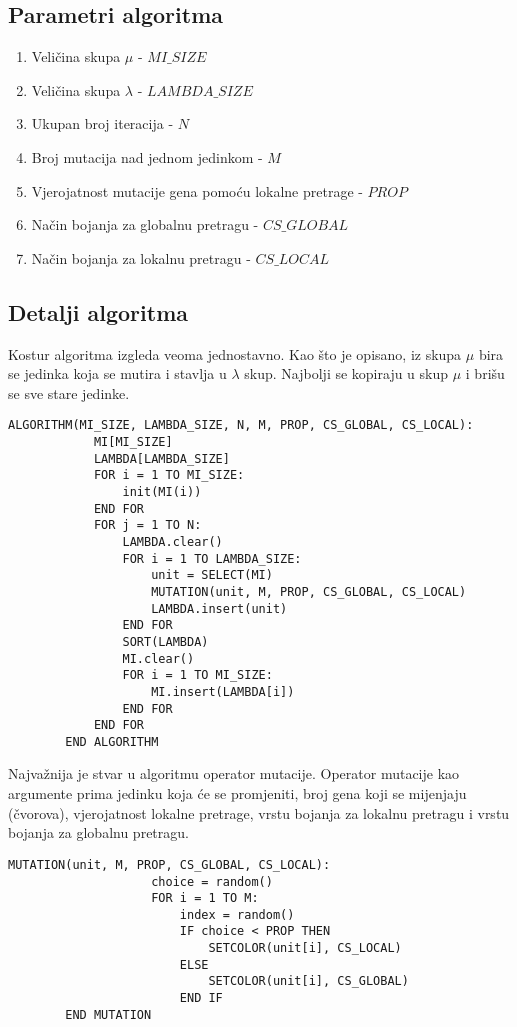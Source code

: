 \documentclass[times, utf8, diplomski, numeric]{fer}
\begin{document}
\subsection{Parametri algoritma}

\begin{enumerate}
	\item Veličina skupa $\mu$ - $MI\_SIZE$
	\item Veličina skupa $\lambda$ - $LAMBDA\_SIZE$
	\item Ukupan broj iteracija - $N$
	\item Broj mutacija nad jednom jedinkom - $M$
	\item Vjerojatnost mutacije gena pomoću lokalne pretrage - $PROP$
	\item Način bojanja za globalnu pretragu - $CS\_GLOBAL$
	\item Način bojanja za lokalnu pretragu - $CS\_LOCAL$
\end{enumerate}

\subsection{Detalji algoritma}

Kostur algoritma izgleda veoma jednostavno. Kao što je opisano, iz skupa $\mu$ bira se jedinka koja se mutira i stavlja u $\lambda$ skup. Najbolji se kopiraju u skup $\mu$ i brišu se sve stare jedinke. 

\begin{singlespace}
	\begin{lstlisting}[caption=Pseudok\^{o}d evolucijske strategije]
		ALGORITHM(MI_SIZE, LAMBDA_SIZE, N, M, PROP, CS_GLOBAL, CS_LOCAL):
			MI[MI_SIZE]
			LAMBDA[LAMBDA_SIZE]
			FOR i = 1 TO MI_SIZE:
				init(MI(i))
			END FOR
			FOR j = 1 TO N:
				LAMBDA.clear()
				FOR i = 1 TO LAMBDA_SIZE:
					unit = SELECT(MI)
					MUTATION(unit, M, PROP, CS_GLOBAL, CS_LOCAL)
					LAMBDA.insert(unit)
				END FOR
				SORT(LAMBDA)
				MI.clear()
				FOR i = 1 TO MI_SIZE:
					MI.insert(LAMBDA[i])
				END FOR
			END FOR
		END ALGORITHM
	\end{lstlisting}
\end{singlespace}

Najvažnija je stvar u algoritmu operator mutacije. Operator mutacije kao argumente prima jedinku koja će se promjeniti, broj gena koji se mijenjaju (čvorova), vjerojatnost lokalne pretrage, vrstu bojanja za lokalnu pretragu i vrstu bojanja za globalnu pretragu. 

\begin{singlespace}
	\begin{lstlisting}[caption=Pseudok\^{o}d mutacije evolucijske strategije]
		MUTATION(unit, M, PROP, CS_GLOBAL, CS_LOCAL):
					choice = random()
					FOR i = 1 TO M:
						index = random()
						IF choice < PROP THEN
							SETCOLOR(unit[i], CS_LOCAL)
						ELSE
							SETCOLOR(unit[i], CS_GLOBAL)
						END IF
		END MUTATION
	\end{lstlisting}
\end{singlespace}
\end{document}
